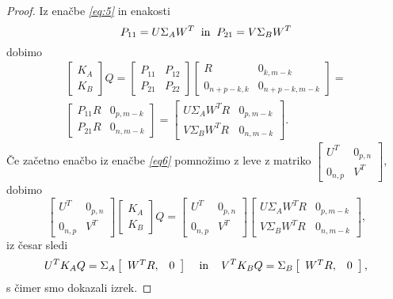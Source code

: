 \documentclass[mat1]{article}
\theoremstyle{definition}
\begin{document}
\begin{proof}
Iz enačbe  \textit{\eqref{eq:5}} in enakosti
$$
P_{11} = U \Sigma_A W^T
\hspace{2mm} \text{in} \hspace{2mm}
P_{21} = V \Sigma_B W^T
$$ dobimo
\begin{equation} \label{eq6}
\begin{split}
\begin{bmatrix} 
K_A \\
K_B 
\end{bmatrix} Q =
\begin{bmatrix} 
P_{11} & P_{12} \\
P_{21} & P_{22} 
\end{bmatrix}
\begin{bmatrix} 
R & 0_{k, m-k} \\
0_{n+p-k, k} & 0_{n+p-k, m-k}  
\end{bmatrix} =
\\
\begin{bmatrix} 
P_{11}R & 0_{p, m-k} \\
P_{21}R & 0_{n, m-k} 
\end{bmatrix} =
\begin{bmatrix} 
U \Sigma_A W^T R & 0_{p, m-k} \\
V \Sigma_B W^T R & 0_{n, m-k} 
\end{bmatrix} \text{.}
\end{split}
\end{equation}
Če začetno enačbo iz enačbe \textit{\eqref{eq6}} pomnožimo z leve z matriko 
$
\begin{bmatrix}
U^T & 0_{p, n} \\
0_{n, p} & V^T
\end{bmatrix}
$, dobimo 
$$
\begin{bmatrix}
U^T & 0_{p, n} \\
0_{n, p} & V^T
\end{bmatrix}
\begin{bmatrix} 
K_A \\
K_B 
\end{bmatrix} Q =
\begin{bmatrix}
U^T & 0_{p, n} \\
0_{n, p} & V^T
\end{bmatrix}
\begin{bmatrix} 
U \Sigma_A W^T R & 0_{p, m-k} \\
V \Sigma_B W^T R & 0_{n, m-k} 
\end{bmatrix} \text{,}
$$
iz česar sledi
$$
U^T K_A Q = 
\Sigma_A  \left[\begin{array}{cc} W^T R, & 0 \end{array}\right] \hspace{4mm} \text{in} \hspace{4mm} V^T K_B Q = \Sigma_B  \left[\begin{array}{cc} W^T R, & 0 \end{array}\right] \text{,}
$$
s čimer smo dokazali izrek.
\end{proof}
\end{document}
